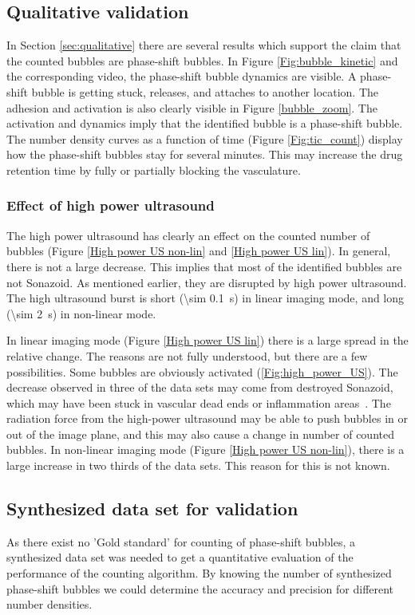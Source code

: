 \subsection{Qualitative validation}
In Section \ref{sec:qualitative} there are several results which support the claim that the counted bubbles are phase-shift bubbles. In Figure \ref{Fig:bubble_kinetic} and the corresponding video, the phase-shift bubble dynamics are visible. A phase-shift bubble is getting stuck, releases, and attaches to another location. The adhesion and activation is also clearly visible in Figure \ref{bubble_zoom}. The activation and dynamics imply that the identified bubble is a phase-shift bubble. The number density curves as a function of time (Figure \ref{Fig:tic_count}) display how the phase-shift bubbles stay for several minutes. This may increase the drug retention time by fully or partially blocking the vasculature.

\subsubsection{Effect of high power ultrasound}
The high power ultrasound has clearly an effect on the counted number of bubbles (Figure \ref{High power US non-lin} and \ref{High power US lin}). In general, there is not a large decrease. This implies that most of the identified bubbles are not Sonazoid\texttrademark{}. As mentioned earlier, they are disrupted by high power ultrasound. The high ultrasound burst is short (\SI{\sim 0.1}{\second}) in linear imaging mode, and long (\SI{\sim 2}{\second}) in non-linear mode.

In linear imaging mode (Figure \ref{High power US lin}) there is a large spread in the relative change. The reasons are not fully understood, but there are a few possibilities. Some bubbles are obviously activated (\ref{Fig:high_power_US}). The decrease observed in three of the data sets may come from destroyed Sonazoid\texttrademark{}, which may have been stuck in vascular dead ends or inflammation areas~\cite{Healey_pc}. The radiation force from the high-power ultrasound may be able to push bubbles in or out of the image plane, and this may also cause a change in number of counted bubbles. In non-linear imaging mode (Figure \ref{High power US non-lin}), there is a large increase in two thirds of the data sets. This reason for this is not known.

\subsection{Synthesized data set for validation}
As there exist no 'Gold standard' for counting of phase-shift bubbles, a synthesized data set was needed to get a quantitative evaluation of the performance of the counting algorithm. By knowing the number of synthesized phase-shift bubbles we could determine the accuracy and precision for different number densities.

